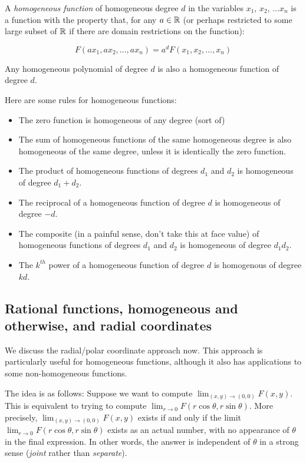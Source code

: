 \documentclass[10pt]{amsart}
\begin{document}
A {\em homogeneous function} of homogeneous degree $d$ in the
variables $x_1$, $x_2$, $\dots x_n$ is a function with the property
that, for any $a \in \mathbb{R}$ (or perhaps restricted to some large subset
of $\mathbb{R}$ if there are domain restrictions on the function):

$$F(ax_1,ax_2,\dots,ax_n) = a^dF(x_1,x_2,\dots,x_n)$$

Any homogeneous polynomial of degree $d$ is also a homogeneous
function of degree $d$.

Here are some rules for homogeneous functions:

\begin{itemize}
\item The zero function is homogeneous of any degree (sort of)
\item The sum of homogeneous functions of the same homogeneous degree
  is also homogeneous of the same degree, unless it is identically the
  zero function.
\item The product of homogeneous functions of degrees $d_1$ and $d_2$
  is homogeneous of degree $d_1 + d_2$.
\item The reciprocal of a homogeneous function of degree $d$ is
  homogeneous of degree $-d$.
\item The composite (in a painful sense, don't take this at face
  value) of homogeneous functions of degrees $d_1$ and $d_2$ is
  homogeneous of degree $d_1d_2$.
\item The $k^{th}$ power of a homogeneous function of degree $d$ is
  homogenous of degree $kd$.
\end{itemize}

\subsection{Rational functions, homogeneous and otherwise, and radial coordinates}

We discuss the radial/polar coordinate approach now. This approach is
particularly useful for homogeneous functions, although it also has
applications to some non-homogeneous functions.

The idea is as follows: Suppose we want to compute $\lim_{(x,y) \to
(0,0)} F(x,y)$. This is equivalent to trying to compute $\lim_{r \to
0} F(r\cos \theta, r\sin \theta)$. More precisely, $\lim_{(x,y) \to
(0,0)} F(x,y)$ exists if and only if the limit $\lim_{r \to 0} F(r\cos
\theta, r\sin \theta)$ exists as an actual number, with no appearance
of $\theta$ in the final expression. In other words, the answer is
independent of $\theta$ in a strong sense ({\em joint} rather than
{\em separate}).
\end{document}
